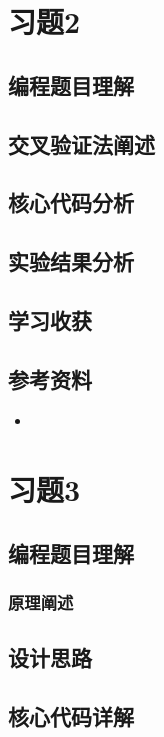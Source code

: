 \documentclass{ctexart}
\begin{document}
	\section{习题2}
	\subsection{编程题目理解}

	\subsection{交叉验证法阐述}
	
	\subsection{核心代码分析}

	\subsection{实验结果分析}
	
	\subsection{学习收获}
	
	\subsection{参考资料}
	
	\begin{itemize}
		\item
	\end{itemize}
	
	\section{习题3}
	\subsection{编程题目理解}
	\subsubsection{原理阐述}
	\subsection{设计思路}
	
	\subsection{核心代码详解}
\end{document}
